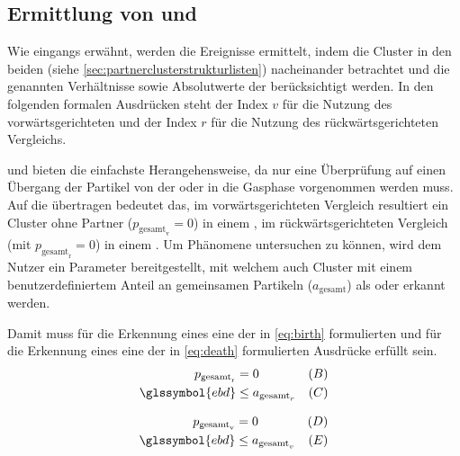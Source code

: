 \subsection*{Ermittlung von  und }
Wie eingangs erwähnt, werden die Ereignisse ermittelt, indem die Cluster in den beiden  (siehe \autoref{sec:partnerclusterstrukturlisten}) nacheinander betrachtet und die genannten Verhältnisse sowie Absolutwerte der  berücksichtigt werden. In den folgenden formalen Ausdrücken steht der Index $v$ für die Nutzung des vorwärtsgerichteten und der Index $r$ für die Nutzung des rückwärtsgerichteten Vergleichs.

 und  bieten die einfachste Herangehensweise, da nur eine Überprüfung auf einen Übergang der Partikel von der oder in die Gasphase vorgenommen werden muss. Auf die  übertragen bedeutet das, im vorwärtsgerichteten Vergleich resultiert ein Cluster ohne Partner ($p_{\text{gesamt}_\text{v}} = 0$) in einem , im rückwärtsgerichteten Vergleich (mit $p_{\text{gesamt}_\text{r}} = 0$) in einem . Um Phänomene untersuchen zu können, wird dem Nutzer ein Parameter  bereitgestellt, mit welchem auch Cluster mit einem benutzerdefiniertem Anteil an gemeinsamen Partikeln ($a_\text{gesamt}$) als  oder  erkannt werden.

Damit muss für die Erkennung eines  eine der in \autoref{eq:birth} formulierten und für die Erkennung eines  eine der in  \autoref{eq:death} formulierten Ausdrücke erfüllt sein.
\begin{equation}
	\begin{aligned}\label{eq:birth}
		p_{\text{gesamt}_\text{r}} &= 0 &(B)\\
		\glssymbol{ebd} &\le a_{\text{gesamt}_r} &(C)
	\end{aligned}
\end{equation}

\begin{equation}
	\begin{aligned}\label{eq:death}
		p_{\text{gesamt}_\text{v}} &= 0 &(D)\\
		\glssymbol{ebd} &\le a_{\text{gesamt}_v} &(E)
\end{aligned}
\end{equation}

